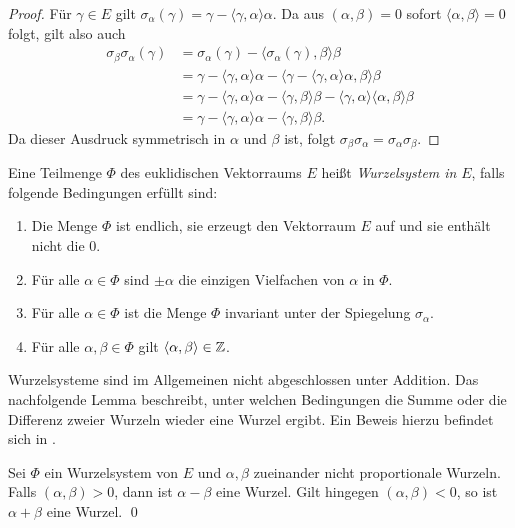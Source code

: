 \begin{proof}
  Für $\gamma \in E$ gilt $\sigma_\alpha(\gamma) = \gamma - \langle \gamma, \alpha \rangle \alpha$. Da aus $(\alpha, \beta) = 0$ sofort $\langle \alpha, \beta \rangle = 0$ folgt, gilt also auch
  \begin{align*}
    \sigma_\beta \sigma_\alpha(\gamma) 
    &= \sigma_\alpha(\gamma) - \langle \sigma_\alpha(\gamma), \beta \rangle \beta \\
    &= \gamma - \langle \gamma, \alpha \rangle \alpha 
              - \langle \gamma- \langle \gamma, \alpha\rangle \alpha, \beta \rangle \beta \\
    &= \gamma - \langle \gamma, \alpha \rangle \alpha 
              - \langle \gamma, \beta \rangle \beta - \langle \gamma, \alpha \rangle \langle \alpha, \beta \rangle \beta \\
    &= \gamma - \langle \gamma, \alpha \rangle \alpha - \langle \gamma, \beta \rangle \beta.
  \end{align*} 
  Da dieser Ausdruck symmetrisch in $\alpha$ und $\beta$ ist, folgt $\sigma_\beta \sigma_\alpha = \sigma_\alpha \sigma_\beta$.
\end{proof}

\begin{defn}
  Eine Teilmenge $\Phi$ des euklidischen Vektorraums $E$ heißt \emph{Wurzelsystem in} $E$, falls folgende Bedingungen erfüllt sind:
  \begin{enumerate}[(R1)]
    \item\label{it:R1} Die Menge $\Phi$ ist endlich, sie erzeugt den Vektorraum $E$ auf und sie enthält nicht die $0$.
    \item\label{it:R2} Für alle $\alpha \in \Phi$ sind $\pm \alpha$ die einzigen Vielfachen von $\alpha$ in $\Phi$.
    \item\label{it:R3} Für alle $\alpha \in \Phi$ ist die Menge $\Phi$ invariant unter der Spiegelung $\sigma_\alpha$.
    \item\label{it:R4} Für alle $\alpha, \beta \in \Phi$ gilt $\langle \alpha, \beta \rangle \in \mathbb{Z}$.
  \end{enumerate}
\end{defn}

Wurzelsysteme sind im Allgemeinen nicht abgeschlossen unter Addition. 
Das nachfolgende Lemma beschreibt, unter welchen Bedingungen die Summe oder die Differenz zweier Wurzeln wieder eine Wurzel ergibt. Ein Beweis hierzu befindet sich in \cite[S.45]{humphreys1972introduction}.

\begin{lem}
  \label{lem:sumDiffRoot}
  Sei $\Phi$ ein Wurzelsystem von $E$ und $\alpha, \beta$ zueinander nicht proportionale Wurzeln.
  Falls $(\alpha, \beta) > 0$, dann ist $\alpha - \beta$ eine Wurzel.
  Gilt hingegen $(\alpha, \beta) < 0$, so ist $\alpha + \beta$ eine Wurzel. \qed
\end{lem}

